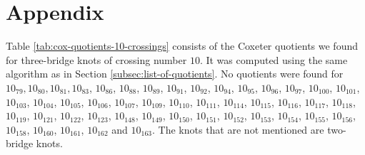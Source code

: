 \documentclass[main.tex]{subfiles}
\begin{document}
\section{Appendix}\label{sec:data}
Table \ref{tab:cox-quotients-10-crossings} consists of the Coxeter quotients we found for three-bridge knots of crossing number $10$. It was computed using the same algorithm as in Section \ref{subsec:list-of-quotients}. No quotients were found for $10_{79}, 10_{80}, 10_{81}, 
10_{83}$, $10_{86}$, $10_{88}$, $10_{89}$, $10_{91}$, $10_{92}$, $10_{94}$, $10_{95}$, $10_{96}$, $10_{97}$,
$10_{100}$, $10_{101}$, $10_{103}$, $10_{104}$, $10_{105}$, $10_{106}$, $10_{107}$, $10_{109}$, $10_{110}$, $10_{111}$, $10_{114}$, $10_{115}$, $10_{116}$, $10_{117}$, $10_{118}$, $10_{119}$, $10_{121}$, $10_{122}$, $10_{123}$,
$10_{148}$, $10_{149}$, $10_{150}$, $10_{151}$, $10_{152}$, $10_{153}$, $10_{154}$, $10_{155}$, $10_{156}$, $10_{158}$,
$10_{160}$, $10_{161}$, $10_{162}$ and $10_{163}$. The knots that are not mentioned are two-bridge knots.
\end{document}
